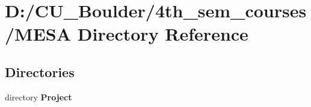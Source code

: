 \section{D\+:/\+C\+U\+\_\+\+Boulder/4th\+\_\+sem\+\_\+courses/\+M\+E\+SA Directory Reference}
\label{dir_57abe2b1b2d021879652e913a56990d2}
\subsection*{Directories}
\begin{DoxyCompactItemize}
\item 
directory \textbf{ Project}
\end{DoxyCompactItemize}
